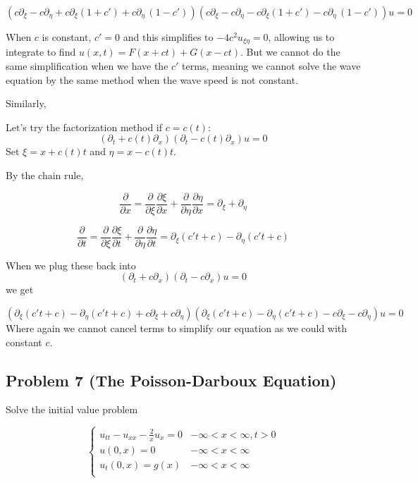 \documentclass[
]{article}
\begin{document}
\[ \left(c\partial_{\xi}-c\partial_{\eta}+c\partial_{\xi}(1+c')+c\partial_{\eta}\,(1-c')\right)
\left(c\partial_{\xi}-c\partial_{\eta} -c\partial_{\xi}(1+c')-c\partial_{\eta}\,(1-c')\right)u=0\]

When \(c\) is constant, \(c'=0\) and this simplifies to
\(-4c^2 u_{\xi\eta}=0\), allowing us to integrate to find
\(u(x,t)=F(x+ct)+G(x-ct)\). But we cannot do the same simplification
when we have the \(c'\) terms, meaning we cannot solve the wave equation
by the same method when the wave speed is not constant.

Similarly,

Let's try the factorization method if \(c=c(t)\):
\[\left( \partial_{t}+c(t)\partial_{x}\right) \left(\partial_{t}-c(t)\partial_{x}\right)u=0\]
Set \(\xi=x+c(t)t\) and \(\eta=x-c(t)t\).

By the chain rule,

\[\frac{\partial}{\partial x} = \frac{\partial}{\partial \xi} \frac{\partial \xi}{\partial x}+\frac{\partial}{\partial\eta}\frac{\partial\eta}{\partial x}=
\partial_{\xi}+\partial_{\eta}\]

\[\frac{\partial}{\partial t} = \frac{\partial}{\partial \xi} \frac{\partial \xi}{\partial t}+\frac{\partial }{\partial\eta}\frac{\partial\eta}{\partial t}=\partial_{\xi}(c't+c)-\partial_{\eta}(c't+c)
\]

When we plug these back into
\[\left( \partial_{t}+c\partial_{x}\right) \left(\partial_{t}-c\partial_{x}\right)u=0\]
we get

\[\left( \partial_{\xi}(c't+c)-\partial_{\eta}(c't+c)+c\partial_{\xi}+c\partial_{\eta} \right)
\left(\partial_{\xi}(c't+c)-\partial_{\eta}(c't+c)-c\partial_{\xi}-c\partial_{\eta}\right)u=0\]
Where again we cannot cancel terms to simplify our equation as we could
with constant \(c\).

\hypertarget{problem-7-the-poisson-darboux-equation}{%
\subsection{Problem 7 (The Poisson-Darboux
Equation)}\label{problem-7-the-poisson-darboux-equation}}

Solve the initial value problem

\begin{equation} 
\begin{cases}
  u_{tt}-u_{xx}- \frac{2}{x}u_x=0 & -\infty <x<\infty, t>0 \\
  u(0,x)=0 & -\infty <x<\infty \\
  u_t(0,x)=g(x) & -\infty <x< \infty \\
\end{cases}
\end{equation}
\end{document}

